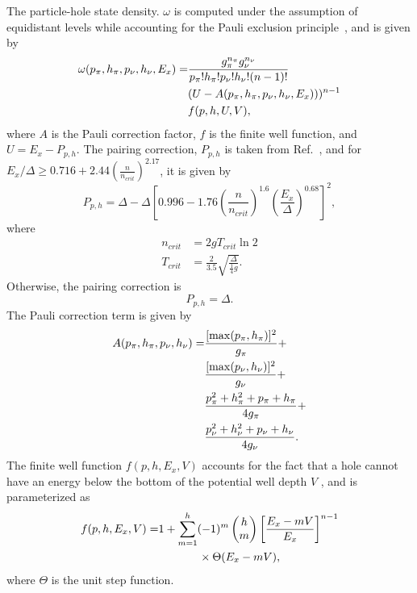 \documentclass[
10pt,
showpacs,preprintnumbers,footinbib,
amsfonts,amsmath,amssymb,
aps,
prc,twocolumn,groupedaddress,superscriptaddress,
showkeys,
nofootinbib
]{revtex4-1}
\begin{document}
The particle-hole state density. $\omega$ is computed under the assumption of equidistant levels while accounting for the Pauli exclusion principle~\cite{Betak:1976,Dobes:1983}, and is given by
\begin{align}
\omega(p_\pi,h_\pi,p_\nu,h_\nu,E_x) = & \frac{g_\pi^{n_\pi}g_\nu^{n_\nu}}{p_\pi!h_\pi!p_\nu!h_\nu!(n-1)!} \notag \\
&(U-A(p_\pi,h_\pi,p_\nu,h_\nu,E_x)))^{n-1} \notag \\
& f(p,h,U,V), 
\end{align}
where $A$ is the Pauli correction factor, $f$ is the finite well function, and $U = E_x - P_{p,h}$. The
pairing correction, $P_{p,h}$ is taken from Ref.~\cite{Fu:1984}, and for $E_x/\Delta \ge 0.716 + 2.44\left ( \frac{n}{n_{crit}}\right )^{2.17}$, it is given by
\begin{equation}
P_{p,h} = \Delta - \Delta\left [ 0.996 - 1.76\left ( \frac{n}{n_{crit}}\right )^{1.6} \left (\frac{E_x}{\Delta}\right )^{0.68}\right ]^2,
\end{equation}
where
\begin{align}
n_{crit} &= 2gT_{crit}\ln 2\\
T_{crit} &= \frac{2}{3.5}\sqrt{\frac{\Delta}{\frac{1}{4} g}}.
\end{align}
Otherwise, the pairing correction is 
\begin{equation}
P_{p,h}=\Delta.
\end{equation}
The Pauli correction term is given by
\begin{align}
A(p_\pi,h_\pi,p_\nu,h_\nu) = & \frac{[\max(p_\pi,h_\pi)]^2}{g_\pi}+ \notag\\
& \frac{[\max(p_\nu,h_\nu)]^2}{g_\nu}+ \notag\\
& \frac{p_\pi^2+h_\pi^2 + p_\pi + h_\pi}{4g_\pi}+ \notag\\
& \frac{p_\nu^2+h_\nu^2 + p_\nu + h_\nu}{4g_\nu}.
\end{align}
The finite well function $f(p, h,E_x, V)$ accounts for the fact that a hole cannot have an energy below the bottom of the potential well depth $V$ , and is parameterized as
\begin{align}
f(p, h,E_x, V) =& 1 + \sum_{m=1}^h(-1)^m \begin{pmatrix} h\\m\end{pmatrix}  \left [ \frac{E_x - mV}{E_x}\right ]^{n-1} \notag\\
& \hskip 1.25 cm \times\Theta(E_x - mV),
\end{align}
where $\Theta$ is the unit step function.
\end{document}
